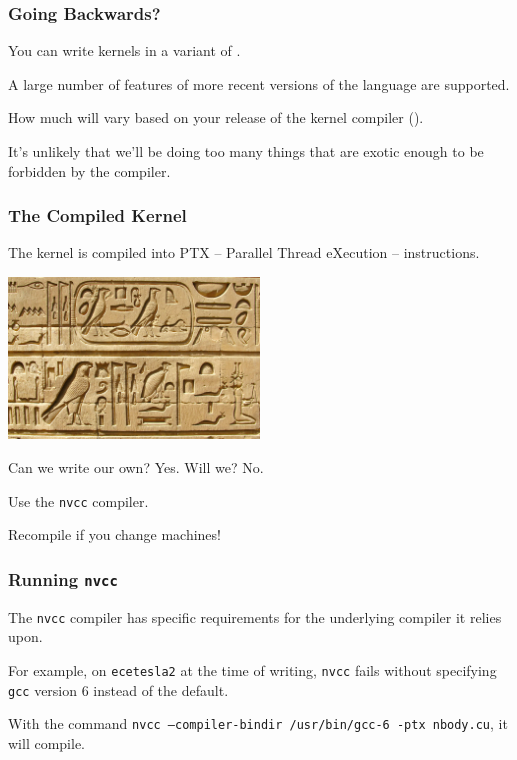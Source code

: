 \begin{frame}
\frametitle{Going Backwards?}

You can write kernels in a variant of \CPP.


A large number of features of more recent versions of the language are supported.

How much will vary based on your release of the kernel compiler ().

It's unlikely that we'll be doing too many things that are exotic enough to be forbidden by the compiler.

\end{frame}


\begin{frame}
\frametitle{The Compiled Kernel}

The kernel is compiled into PTX -- Parallel Thread eXecution -- instructions.

\begin{center}
	\includegraphics[width=0.5\textwidth]{images/hieroglyphics.jpg}
\end{center}

Can we write our own? Yes. Will we? No.

Use the \texttt{nvcc} compiler.

Recompile if you change machines!

\end{frame}


\begin{frame}
\frametitle{Running \texttt{nvcc}}

The \texttt{nvcc} compiler has specific requirements for the underlying compiler it relies upon. 

For example, on \texttt{ecetesla2} at the time of writing, \texttt{nvcc} fails without specifying \texttt{gcc} version 6 instead of the default. 

With the command \texttt{nvcc --compiler-bindir /usr/bin/gcc-6 -ptx nbody.cu}, it will compile. 


\end{frame}


